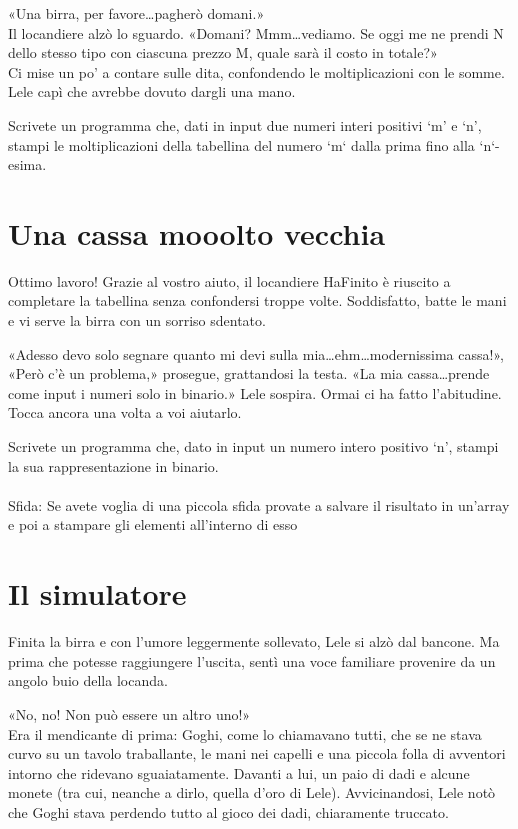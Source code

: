 \documentclass[a4paper]{article}
\begin{document}
«Una birra, per favore\dots pagherò domani.»\\
Il locandiere alzò lo sguardo. «Domani? Mmm\dots vediamo. Se oggi me ne prendi N dello stesso tipo con ciascuna prezzo M, quale sarà il costo in totale?»\\
Ci mise un po' a contare sulle dita, confondendo le moltiplicazioni con le somme.
Lele capì che avrebbe dovuto dargli una mano.

Scrivete un programma che, dati in input due numeri interi positivi `m' e `n', stampi le moltiplicazioni della tabellina del numero `m` dalla prima fino alla `n`-esima.

\section*{Una cassa mooolto vecchia}
Ottimo lavoro! Grazie al vostro aiuto, il locandiere HaFinito è riuscito a completare la tabellina senza confondersi troppe volte. Soddisfatto, batte le mani e vi serve la birra con un sorriso sdentato.

«Adesso devo solo segnare quanto mi devi sulla mia\dots ehm\dots modernissima cassa!»,\\
«Però c'è un problema,» prosegue, grattandosi la testa. «La mia cassa\dots prende come input i numeri solo in binario.»
Lele sospira. Ormai ci ha fatto l'abitudine. Tocca ancora una volta a voi aiutarlo.

Scrivete un programma che, dato in input un numero intero positivo `n', stampi la sua rappresentazione in binario.\\
\\
Sfida: Se avete voglia di una piccola sfida provate a salvare il risultato in un'array e poi a stampare gli elementi all'interno di esso

\section*{Il simulatore}
Finita la birra e con l'umore leggermente sollevato, Lele si alzò dal bancone. Ma prima che potesse raggiungere l'uscita, sentì una voce familiare provenire da un angolo buio della locanda.

«No, no! Non può essere un altro uno!»\\
Era il mendicante di prima: Goghi, come lo chiamavano tutti, che se ne stava curvo su un tavolo traballante, le mani nei capelli e una piccola folla di avventori intorno che ridevano sguaiatamente. Davanti a lui, un paio di dadi e alcune monete (tra cui, neanche a dirlo, quella d'oro di Lele).
Avvicinandosi, Lele notò che Goghi stava perdendo tutto al gioco dei dadi, chiaramente truccato.
\end{document}
